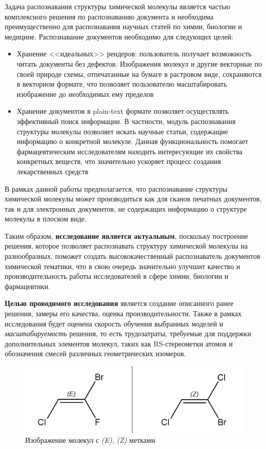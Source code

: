 Задача распознавания структуры химической молекулы является частью комплексного решения по распознаванию документа и необходима преимущественно для распознавания научных статей по химии, биологии и медицине. Распознавание документов необходимо для следующих целей:
\begin{itemize}
	\item Хранение <<идеальных>> рендеров: пользователь получает возможность читать документы без дефектов. Изображения молекул и другие векторные по своей природе схемы, отпечатанные на бумаге в растровом виде, сохраняются в векторном формате, что позволяет пользователю масштабировать изображение до необходимых ему пределов
	
	\item Хранение документов в plain-text формате позволяет осуществлять эффективный поиск информации. В частности, модуль распознавания структуры молекулы позволяет искать научные статьи, содержащие информацию о конкретной молекуле. Данная функциональность помогает фармацевтическим исследователям находить интересующие их свойства конкретных веществ, что значительно ускоряет процесс создания лекарственных средств
\end{itemize}

В рамках данной работы предполагается, что распознавание структуры химической молекулы может производиться как для сканов печатных документов, так и для электронных документов, не содержащих информацию о структуре молекулы в плоском виде.

Таким образом, \textbf{исследование является актуальным}, поскольку построение решения, которое позволяет распознавать структуру химической молекулы на разнообразных, поможет создать высококачественный распознаватель документов химической тематики, что в свою очередь значительно улучшит качество и производительность работы исследователей в сфере химии, биологии и фармацевтики.

\textbf{Целью проводимого исследования} является создание описанного ранее решения, замеры его качества, оценка производительности. Также в рамках исследования будет оценена скорость обучения выбранных моделей и \textit{масштабируемость} решения, то есть трудозатраты, требуемые для поддержки дополнительных элементов молекул, таких как RS-стереометки атомов и обозначения смесей различных геометрических изомеров.

\begin{figure}[ht!] 
	\center
	\includegraphics [scale=0.74] {my_folder/images/ez}
	\caption{Изображение молекул с \textit{(E)}, \textit{(Z)} метками \cite{stereochem}}
	\label{fig:ez}  
\end{figure}

